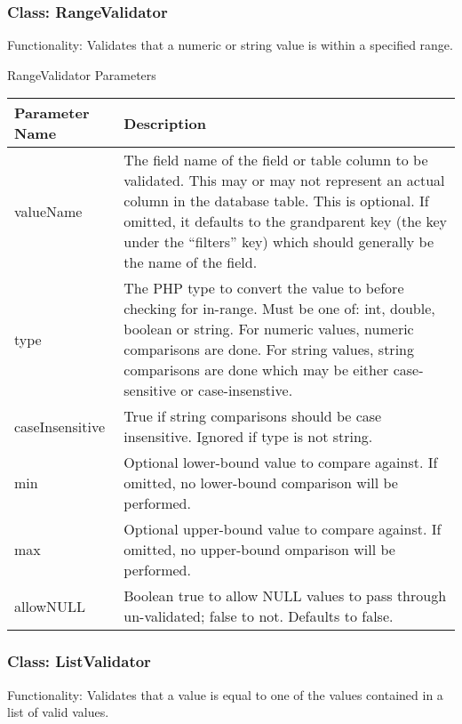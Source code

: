 \documentclass[letterpaper,10pt,english]{sphinxmanual}
\begin{document}
\subsubsection{Class: RangeValidator}
\label{jaxFrameworkGuide:class-rangevalidator}
Functionality: Validates that a numeric or string value is within a specified range.

RangeValidator Parameters

\begin{tabulary}{\linewidth}{|L|L|}
\hline
\textbf{
Parameter Name
} & \textbf{
Description
}\\\hline

valueName
 & 
The field name of the field or table column to be validated.  This may or may not
represent an actual column in the database table.  This is optional.  If omitted, it
defaults to the grandparent key (the key under the ``filters'' key) which should
generally be the name of the field.
\\\hline

type
 & 
The PHP type to convert the value to before checking for in-range.  Must be one of:
int, double, boolean or string.  For numeric values, numeric comparisons are done.
For string values, string comparisons are done which may be either case-sensitive or
case-insenstive.
\\\hline

caseInsensitive
 & 
True if string comparisons should be case insensitive.  Ignored if type is not
string.
\\\hline

min
 & 
Optional lower-bound value to compare against.  If omitted, no lower-bound
comparison will be performed.
\\\hline

max
 & 
Optional upper-bound value to compare against.  If omitted, no upper-bound
omparison will be performed.
\\\hline

allowNULL
 & 
Boolean true to allow NULL values to pass through un-validated; false to not.
Defaults to false.
\\\hline
\end{tabulary}



\subsubsection{Class: ListValidator}
\label{jaxFrameworkGuide:class-listvalidator}
Functionality: Validates that a value is equal to one of the values contained in a list of valid
values.
\end{document}

